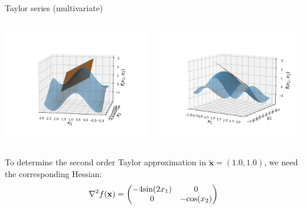 \begin{vbframe}{Taylor series (multivariate)}
  \begin{columns}
    \begin{column}{0.48\textwidth}
      \includegraphics[width = \textwidth]{figure_man/Taylor2D/Taylor2D_1st100.png}
    \end{column}
    \begin{column}{0.48\textwidth}
      \includegraphics[width = \textwidth]{figure_man/Taylor2D/Taylor2D_1st301.png}
    \end{column}
  \end{columns}
  \framebreak
  \begin{footnotesize}
  To determine the second order Taylor approximation in $\bm{\tilde x} = (1.0, 1.0)$, we need the corresponding Hessian: 
  \vspace*{-0.2cm}
  $$
  \nabla^2 f(\mathbf{x}) = \begin{pmatrix} -4 \text{sin}(2x_1) & 0 \\ 0 & -\text{cos}(x_2) \end{pmatrix}
  $$
  

\end{footnotesize}
\end{vbframe}
